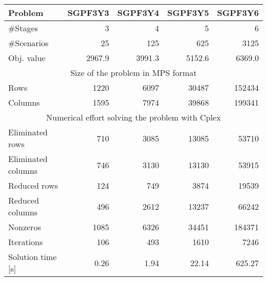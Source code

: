\begin{center}
\begin{tabular}{|l|r|r|r|r|} \hline
Problem            & SGPF3Y3 & SGPF3Y4 & SGPF3Y5 & SGPF3Y6 \\ \hline
\#Stages           &     3   &     4   &     5   &     6 \\
\#Scenarios        &    25   &   125   &   625   &  3125 \\
Obj. value         &  2967.9 &  3991.3 &  5152.6 &  6369.0 \\ \hline
\multicolumn{5}{|c|}{Size of the problem in MPS format} \\ \hline
Rows               &    1220 &    6097 &   30487 &  152434 \\
Columns            &    1595 &    7974 &   39868 &  199341 \\ \hline
\multicolumn{5}{|c|}{Numerical effort solving the problem with Cplex} \\ \hline
Eliminated rows    &     710 &    3085 &   13085 &   53710 \\
Eliminated columns &     746 &    3130 &   13130 &   53915 \\
Reduced rows       &     124 &     749 &    3874 &   19539 \\
Reduced columns    &     496 &    2612 &   13237 &   66242 \\
Nonzeros           &    1085 &    6326 &   34451 &  184371 \\
Iterations         &     106 &     493 &    1610 &    7246 \\
Solution time [s]  &    0.26 &    1.94 &   22.14 &  625.27 \\ \hline
\end{tabular}
\end{center}




